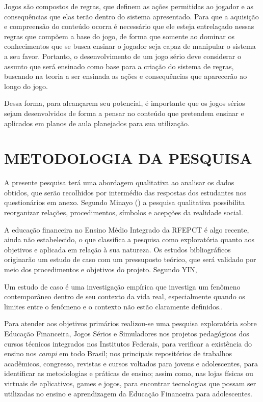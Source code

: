 Jogos são compostos de regras, que definem as ações permitidas ao jogador e as consequências que elas terão dentro do sistema apresentado. Para que a aquisição e compreensão do conteúdo ocorra é necessário que ele esteja entrelaçado nessas regras que compõem a base do jogo, de forma que somente ao dominar os conhecimentos que se busca ensinar o jogador seja capaz de manipular o sistema a seu favor. Portanto, o desenvolvimento de um jogo sério deve considerar o assunto que será ensinado como base para a criação do sistema de regras, buscando na teoria a ser ensinada as ações e consequências que aparecerão ao longo do jogo.
	
Dessa forma, para alcançarem seu potencial, é importante que os jogos sérios sejam desenvolvidos de forma a pensar no conteúdo que pretendem ensinar e aplicados em planos de aula planejados para sua utilização.

\chapter{METODOLOGIA DA PESQUISA}
A presente pesquisa terá uma abordagem qualitativa ao analisar os dados obtidos, que serão recolhidos por intermédio das respostas dos estudantes nos questionários em anexo. Segundo Minayo (\citeyear{minayo2008}) a pesquisa qualitativa possibilita reorganizar relações, procedimentos, símbolos e acepções da realidade social.

A educação financeira no Ensino Médio Integrado da RFEPCT é algo recente, ainda não estabelecido, o que classifica a pesquisa como exploratória quanto aos objetivos e aplicada em relação à sua natureza. Os estudos bibliográficos originarão um estudo de caso com um pressuposto teórico, que será validado por meio dos procedimentos e objetivos do projeto. Segundo YIN,
\begin{citacao}
Um estudo de caso é uma investigação empírica que investiga um fenômeno contemporâneo dentro de seu contexto da vida real, especialmente quando os limites entre o fenômeno e o contexto não estão claramente definidos.\cite{yin2005}.
\end{citacao}
Para atender aos objetivos primários realizou-se uma pesquisa exploratória sobre Educação Financeira, Jogos Sérios e Simuladores nos projetos pedagógicos dos cursos técnicos integrados nos Institutos Federais, para verificar a existência do ensino nos \textit{campi} em todo Brasil; nos principais repositórios de trabalhos acadêmicos, congresso, revistas e cursos voltados para jovens e adolescentes, para identificar as metodologias e práticas de ensino; assim como, nas lojas físicas ou virtuais de aplicativos, games e jogos, para encontrar tecnologias que possam ser utilizadas no ensino e aprendizagem da Educação Financeira para adolescentes.


